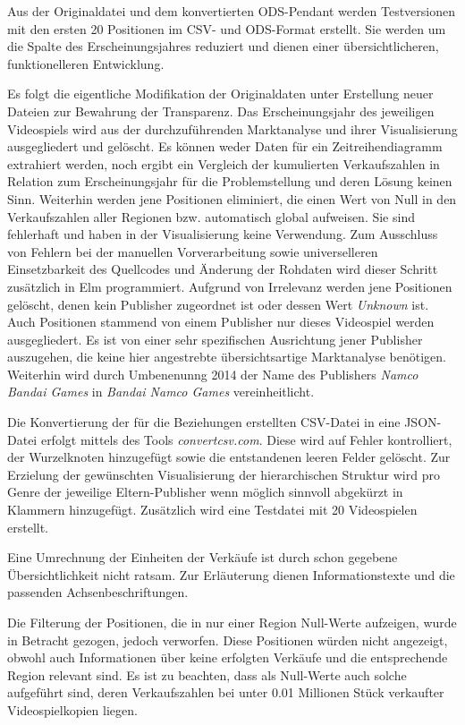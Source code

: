 \documentclass[usegeometry=true]{scrartcl}
\begin{document}
Aus der Originaldatei und dem konvertierten ODS-Pendant werden Testversionen mit den ersten 20 Positionen im CSV- und ODS-Format erstellt.
Sie werden um die Spalte des Erscheinungsjahres reduziert und dienen einer übersichtlicheren, funktionelleren Entwicklung.

Es folgt die eigentliche Modifikation der Originaldaten unter Erstellung neuer Dateien zur Bewahrung der Transparenz.
Das Erscheinungsjahr des jeweiligen Videospiels wird aus der durchzuführenden Marktanalyse und ihrer Visualisierung ausgegliedert und gelöscht. 
Es können weder Daten für ein Zeitreihendiagramm extrahiert werden, noch ergibt ein Vergleich der kumulierten Verkaufszahlen in Relation zum Erscheinungsjahr 
für die Problemstellung und deren Lösung keinen Sinn. 
Weiterhin werden jene Positionen eliminiert, die einen Wert von Null in den Verkaufszahlen aller Regionen bzw. automatisch global aufweisen. 
Sie sind fehlerhaft und haben in der Visualisierung keine Verwendung. 
Zum Ausschluss von Fehlern bei der manuellen Vorverarbeitung sowie universelleren Einsetzbarkeit des Quellcodes und Änderung der Rohdaten 
wird dieser Schritt zusätzlich in Elm programmiert.
Aufgrund von Irrelevanz werden jene Positionen gelöscht, denen kein Publisher zugeordnet ist oder dessen Wert \textit{Unknown} ist. 
Auch Positionen stammend von einem Publisher nur dieses Videospiel werden ausgegliedert.
Es ist von einer sehr spezifischen Ausrichtung jener Publisher auszugehen, die keine hier angestrebte übersichtsartige Marktanalyse benötigen.
Weiterhin wird durch Umbenenunng 2014 der Name des Publishers \textit{Namco Bandai Games} in \textit{Bandai Namco Games} vereinheitlicht.

Die Konvertierung der für die Beziehungen erstellten CSV-Datei in eine JSON-Datei erfolgt mittels des Tools \textit{convertcsv.com}.
Diese wird auf Fehler kontrolliert, der Wurzelknoten hinzugefügt sowie die entstandenen leeren Felder gelöscht. 
Zur Erzielung der gewünschten Visualisierung der hierarchischen Struktur wird pro Genre der jeweilige Eltern-Publisher wenn möglich sinnvoll abgekürzt in Klammern hinzugefügt. 
Zusätzlich wird eine Testdatei mit 20 Videospielen erstellt.

Eine Umrechnung der Einheiten der Verkäufe ist durch schon gegebene Übersichtlichkeit nicht ratsam. 
Zur Erläuterung dienen Informationstexte und die passenden Achsenbeschriftungen.

Die Filterung der Positionen, die in nur einer Region Null-Werte aufzeigen, wurde in Betracht gezogen, jedoch verworfen.
Diese Positionen würden nicht angezeigt, obwohl auch Informationen über keine erfolgten Verkäufe und die entsprechende Region relevant sind. 
Es ist zu beachten, dass als Null-Werte auch solche aufgeführt sind, deren Verkaufszahlen bei unter 0.01 Millionen Stück verkaufter Videospielkopien liegen. 
\end{document}
